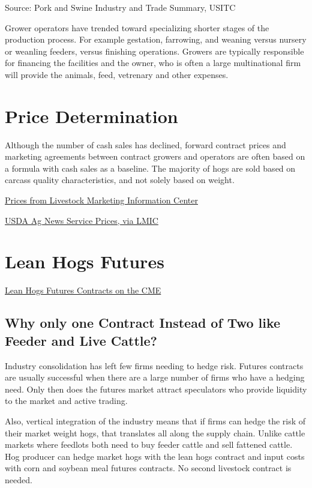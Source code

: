\documentclass[
  letterpaper,
  DIV=11,
  numbers=noendperiod]{scrreprt}
\begin{document}
Source: Pork and Swine Industry and Trade Summary, USITC

Grower operators have trended toward specializing shorter stages of the
production process. For example gestation, farrowing, and weaning versus
nursery or weanling feeders, versus finishing operations. Growers are
typically responsible for financing the facilities and the owner, who is
often a large multinational firm will provide the animals, feed,
vetrenary and other expenses.

\section{Price Determination}\label{price-determination}

Although the number of cash sales has declined, forward contract prices
and marketing agreements between contract growers and operators are
often based on a formula with cash sales as a baseline. The majority of
hogs are sold based on carcass quality characteristics, and not solely
based on weight.

\href{http://www.lmic.info/spreadsheet/prices-and-production}{Prices
from Livestock Marketing Information Center}

\href{http://www.lmic.info/quick_market_reports/hogs}{USDA Ag News
Service Prices, via LMIC}

\section{Lean Hogs Futures}\label{lean-hogs-futures}

\href{http://www.cmegroup.com/trading/agricultural/livestock/lean-hogs.html}{Lean
Hogs Futures Contracts on the CME}

\subsection{Why only one Contract Instead of Two like Feeder and Live
Cattle?}\label{why-only-one-contract-instead-of-two-like-feeder-and-live-cattle}

Industry consolidation has left few firms needing to hedge risk. Futures
contracts are usually successful when there are a large number of firms
who have a hedging need. Only then does the futures market attract
speculators who provide liquidity to the market and active trading.

Also, vertical integration of the industry means that if firms can hedge
the risk of their market weight hogs, that translates all along the
supply chain. Unlike cattle markets where feedlots both need to buy
feeder cattle and sell fattened cattle. Hog producer can hedge market
hogs with the lean hogs contract and input costs with corn and soybean
meal futures contracts. No second livestock contract is needed.
\end{document}
